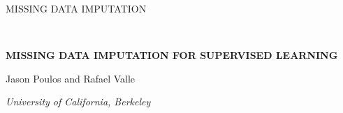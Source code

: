 \documentclass[10pt]{book}
\theoremstyle{definition}
\begin{document}

\renewcommand{\baselinestretch}{2}


{\hfill {\footnotesize\rm MISSING DATA IMPUTATION} \hfill}

\renewcommand{\thefootnote}{}
$\ $\par


\fontsize{12}{14pt plus.8pt minus .6pt}\selectfont \vspace{0.8pc}
\centerline{\large\bf MISSING DATA IMPUTATION FOR SUPERVISED LEARNING}
\vspace{.4cm} \centerline{Jason Poulos and Rafael Valle} \vspace{.4cm} \centerline{\it
University of California, Berkeley} \vspace{.55cm} \fontsize{9}{11.5pt plus.8pt minus
.6pt}\selectfont

\end{document}
